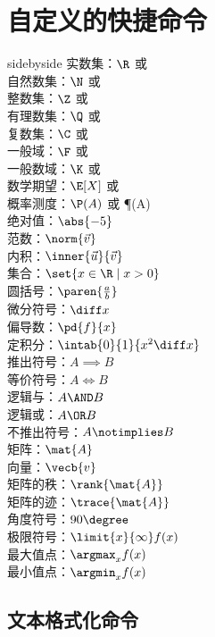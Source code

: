 \section{自定义的快捷命令}

\begin{tcblisting}{sidebyside}
	实数集：$\R$ 或 \R \\
	自然数集：$\N$ 或 \N \\
	整数集：$\Z$ 或 \Z \\
	有理数集：$\Q$ 或 \Q \\
	复数集：$\C$ 或 \C \\
	一般域：$\F$ 或 \F \\
	一般数域：$\K$ 或 \K \\
	数学期望：$\E[X]$ 或 \E[X] \\
	概率测度：$\P(A)$ 或 \P(A) \\
	绝对值：$\abs{-5}$ \\
	范数：$\norm{\vec{v}}$ \\
	内积：$\inner{\vec{u}}{\vec{v}}$ \\
	集合：$\set{x \in \R \mid x > 0}$ \\
	圆括号：$\paren{\frac{a}{b}}$ \\
	微分符号：$\diff x$ \\
	偏导数：$\pd{f}{x}$ \\
	定积分：$\intab{0}{1}{x^2 \diff x}$ \\
	推出符号：$A \implies B$ \\
	等价符号：$A \iff B$ \\
	逻辑与：$A \AND B$ \\
	逻辑或：$A \OR B$ \\
	不推出符号：$A \notimplies B$ \\
	矩阵：$\mat{A}$ \\
	向量：$\vecb{v}$ \\
	矩阵的秩：$\rank{\mat{A}}$ \\
	矩阵的迹：$\trace{\mat{A}}$ \\
	角度符号：$90\degree$ \\
	极限符号：$\limit{x}{\infty} f(x)$ \\
	最大值点：$\argmax_x f(x)$ \\
	最小值点：$\argmin_x f(x)$ \\
\end{tcblisting}

\subsection{文本格式化命令}

